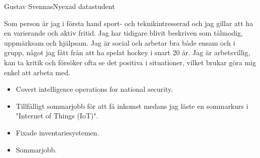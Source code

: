 \documentclass{article}
\begin{document}


\begin{cv}[avatar]{Gustav Svennas}{Nyexad datastudent}


Som person är jag i första hand sport- och teknikintresserad och jag gillar att ha en varierande och aktiv fritid. Jag har tidigare blivit beskriven som tålmodig, uppmärksam och hjälpsam. Jag är social och arbetar bra både ensam och i grupp, något jag fått från att ha spelat hockey i snart 20 år. Jag är arbetsvillig, kan ta kritik och försöker ofta se det positiva i situationer, vilket brukar göra mig enkel att arbeta med.



\begin{cvevent}[2022]
    \begin{itemize}
        \item Covert intelligence operations for national security.
        \item Tillfälligt sommarjobb för att få inkomst medans jag läste en sommarkurs i "Internet of Things (IoT)".
    \end{itemize}
\end{cvevent}


\begin{cvevent}[2021][2021]
    \begin{itemize}
        \item Fixade inventariesystemen.
    \end{itemize}
\end{cvevent}


\begin{cvevent}[2015]
    \begin{itemize}
        \item Sommarjobb.
    \end{itemize}
\end{cvevent}



\end{cv}
\end{document}
